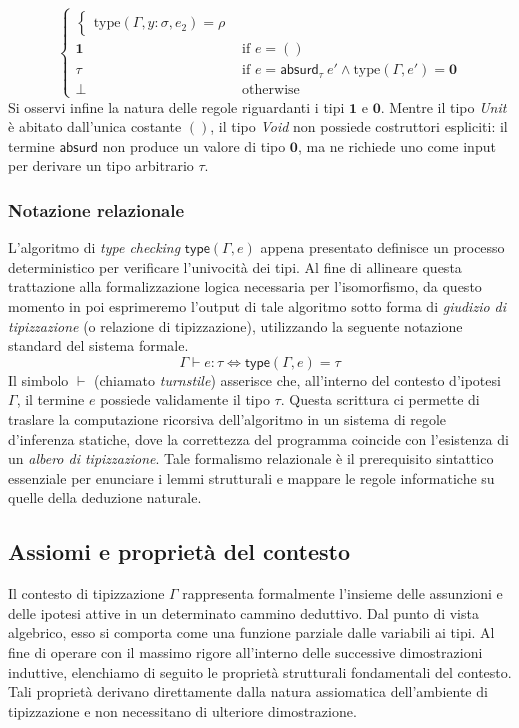 \begin{equation}
\begin{cases}
\begin{cases}
                \text{type}(\Gamma, y:\sigma, e_2) = \rho 
            \end{cases}                                                                                                         \\
        \mathbf{1} & \text{if } e = ()                                                                      \\
        \tau       & \text{if } e = \mathsf{absurd}_{\tau} \ e' \land \text{type}(\Gamma, e') = \mathbf{0}  \\
        \perp      & \text{otherwise}
    \end{cases}
\end{equation}
Si osservi infine la natura delle regole riguardanti i tipi $\mathbf{1}$ e $\mathbf{0}$. Mentre il tipo \emph{Unit} è abitato dall'unica costante $()$, il tipo \emph{Void} 
non possiede costruttori espliciti: il termine $\mathsf{absurd}$ non produce un valore di tipo $\mathbf{0}$, ma ne richiede uno come input per derivare un tipo arbitrario $\tau$.

\subsubsection{Notazione relazionale}
L'algoritmo di \emph{type checking} $\mathsf{type}(\Gamma, e)$ appena presentato definisce un processo deterministico per verificare l'univocità dei tipi. Al fine di allineare questa 
trattazione alla formalizzazione logica necessaria per l'isomorfismo, da questo momento in poi esprimeremo l'output di tale algoritmo sotto forma di \emph{giudizio di tipizzazione} 
(o relazione di tipizzazione), utilizzando la seguente notazione standard del sistema formale.
\begin{equation}
    \Gamma \vdash e : \tau \iff \mathsf{type}(\Gamma, e) = \tau
\end{equation}
Il simbolo $\vdash$ (chiamato \emph{turnstile}) asserisce che, all'interno del contesto d'ipotesi $\Gamma$, il termine $e$ possiede validamente il tipo $\tau$. Questa scrittura ci permette di 
traslare la computazione ricorsiva dell'algoritmo in un sistema di regole d'inferenza statiche, dove la correttezza del programma coincide con l'esistenza di un \emph{albero di tipizzazione}. 
Tale formalismo relazionale è il prerequisito sintattico essenziale per enunciare i lemmi strutturali e mappare le regole informatiche su quelle della deduzione naturale.

\subsection{Assiomi e proprietà del contesto}
Il contesto di tipizzazione $\Gamma$ rappresenta formalmente l'insieme delle assunzioni e delle ipotesi attive in un determinato cammino deduttivo. Dal punto di vista algebrico, esso si comporta 
come una funzione parziale dalle variabili ai tipi. Al fine di operare con il massimo rigore all'interno delle successive dimostrazioni induttive, elenchiamo di seguito le proprietà strutturali 
fondamentali del contesto. Tali proprietà derivano direttamente dalla natura assiomatica dell'ambiente di tipizzazione e non necessitano di ulteriore dimostrazione.

